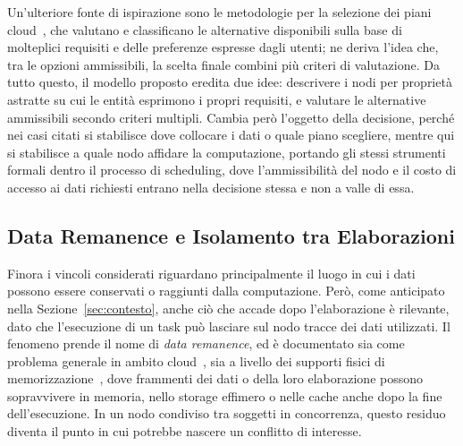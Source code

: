 Un'ulteriore fonte di ispirazione sono le metodologie per la selezione dei piani cloud~\cite{supporting-user-requirement-pref-cloud, cloud-plan-selection-req-multiple-app}, che valutano e classificano le alternative disponibili sulla base di molteplici requisiti e delle preferenze espresse dagli utenti; ne deriva l'idea che, tra le opzioni ammissibili, la scelta finale combini più criteri di valutazione. Da tutto questo, il modello proposto eredita due idee: descrivere i nodi per proprietà astratte su cui le entità esprimono i propri requisiti, e valutare le alternative ammissibili secondo criteri multipli. Cambia però l'oggetto della decisione, perché nei casi citati si stabilisce dove collocare i dati o quale piano scegliere, mentre qui si stabilisce a quale nodo affidare la computazione, portando gli stessi strumenti formali dentro il processo di scheduling, dove l'ammissibilità del nodo e il costo di accesso ai dati richiesti entrano nella decisione stessa e non a valle di essa.


\subsection{Data Remanence e Isolamento tra Elaborazioni}
\label{subsec:chinese_wall_correlati}

Finora i vincoli considerati riguardano principalmente il luogo in cui i dati possono essere conservati o raggiunti dalla computazione. Però, come anticipato nella Sezione~\ref{sec:contesto}, anche ciò che accade dopo l'elaborazione è rilevante, dato che l'esecuzione di un task può lasciare sul nodo tracce dei dati utilizzati. Il fenomeno prende il nome di \emph{data remanence}, ed è documentato sia come problema generale in ambito cloud~\cite{survey-data-remanence-cloud}, sia a livello dei supporti fisici di memorizzazione~\cite{data-remanence-flash-memory}, dove frammenti dei dati o della loro elaborazione possono sopravvivere in memoria, nello storage effimero o nelle cache anche dopo la fine dell'esecuzione. In un nodo condiviso tra soggetti in concorrenza, questo residuo diventa il punto in cui potrebbe nascere un conflitto di interesse.

